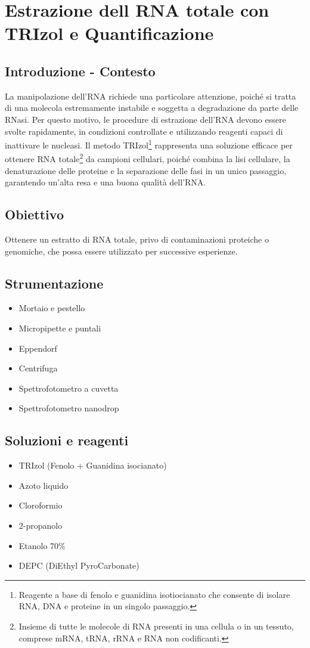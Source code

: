 \section {Estrazione dell RNA totale con TRIzol e Quantificazione}

\subsection{Introduzione - Contesto}
La manipolazione dell’RNA richiede una particolare attenzione, poiché si tratta di una molecola estremamente instabile e soggetta a degradazione da parte delle RNasi. Per questo motivo, le procedure di estrazione dell’RNA devono essere svolte rapidamente, in condizioni controllate e utilizzando reagenti capaci di inattivare le nucleasi. Il metodo TRIzol\footnote{Reagente a base di fenolo e guanidina isotiocianato che consente di isolare RNA, DNA e proteine in un singolo passaggio.} rappresenta una soluzione efficace per ottenere RNA totale\footnote{Insieme di tutte le molecole di RNA presenti in una cellula o in un tessuto, comprese mRNA, tRNA, rRNA e RNA non codificanti.} da campioni cellulari, poiché combina la lisi cellulare, la denaturazione delle proteine e la separazione delle fasi in un unico passaggio, garantendo un’alta resa e una buona qualità dell’RNA.

\subsection{Obiettivo}
Ottenere un estratto di RNA totale, privo di contaminazioni proteiche o genomiche, che possa essere utilizzato per successive esperienze.

\subsection{Strumentazione}
\begin{itemize}
  \item Mortaio e pestello
  \item Micropipette e puntali
  \item Eppendorf
  \item Centrifuga
  \item Spettrofotometro a cuvetta
  \item Spettrofotometro nanodrop
\end{itemize}

\subsection{Soluzioni e reagenti}
\begin{itemize}
  \item TRIzol (Fenolo + Guanidina isocianato)
  \item Azoto liquido
  \item Cloroformio
  \item 2-propanolo
  \item Etanolo 70\%
  \item DEPC (DiEthyl PyroCarbonate)
\end{itemize}

